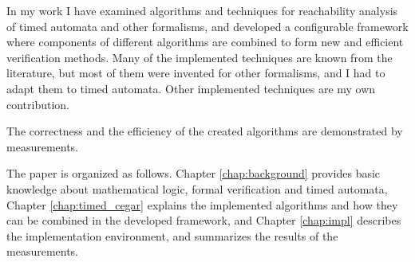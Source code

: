 In my work I have examined  algorithms and techniques for reachability analysis of timed automata and other formalisms, and developed a configurable framework where components of different algorithms are combined to form new and efficient verification methods. Many of the implemented techniques are known from the literature, but most of them were invented for other formalisms, and I had to adapt them to timed automata. Other implemented techniques are my own contribution.

The correctness and the efficiency %
of the created algorithms are demonstrated by measurements.

The paper is organized as follows. Chapter \ref{chap:background} provides basic knowledge about mathematical logic, formal verification and timed automata, Chapter \ref{chap:timed_cegar} explains the implemented algorithms and how they can be combined in the developed framework, and Chapter \ref{chap:impl} describes the implementation environment, and summarizes the results of the measurements.

 


